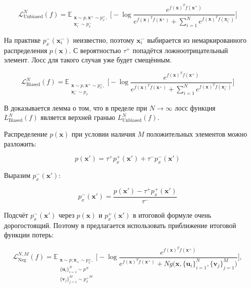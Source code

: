 \documentclass[a4paper, 14pt]{article}
\begin{document}
\begin{equation}\label{eq:1}
\mathcal{L}_{\text{Unbiased}}^N(f) = \mathbb{E}_{\substack{\textbf{x} \sim p, \textbf{x}^+ \sim p^+_x,\\ \textbf{x}_i^- \sim p_x^-}} \bigg[-\log \frac{e^{f(\textbf{x})^T f(\textbf{x}^+)}}{e^{f(\textbf{x})^T f(\textbf{x}^+)} + \sum _{i=1}^N e^{f(\textbf{x})^T f(\textbf{x}_i^-)}}\bigg]
\end{equation}

На практике $p_x^-(\textbf{x}_i^-)$ неизвестно, поэтому $\textbf{x}_i^-$ выбирается из немаркированного распределения $p(\textbf{x})$. С вероятностью $\tau^+$ попадётся ложноотрицательный элемент. Лосс для такого случая уже будет смещённым.

\begin{equation}\label{eq:2}
\mathcal{L}_{\text{Biased}}^N(f) = \mathbb{E}_{\substack{\textbf{x} \sim p, \textbf{x}^+ \sim p^+_x,\\ \textbf{x}_i^- \sim p_x}} \bigg[-\log \frac{e^{f(\textbf{x})^T f(\textbf{x}^+)}}{e^{f(\textbf{x})^T f(\textbf{x}^+)} + \sum _{i=1}^N e^{f(\textbf{x})^T f(\textbf{x}_i^-)}}\bigg]
\end{equation}

В \citep{chuang2020debiased} доказывается лемма о том, что в пределе при $N \to \infty$ лосс функция $L_{\text{Biased}}^N(f)$ является верхней гранью $L_{\text{Unbiased}}^N(f)$.

Распределение $p(\mathbf{x})$ при условии наличия $M$ положительных элементов можно разложить:

\begin{equation}\label{eq:3}
p(\textbf{x}') = \tau^+ p^+_x(\textbf{x}') + \tau^-p_x^-(\textbf{x}')
\end{equation}

Выразим $p^-_x(\textbf{x}')$:

\begin{equation} \label{eq:4}
p_x^-(\textbf{x}') = \frac{p(\textbf{x}') - \tau^+ p^+_x(\textbf{x}')}{\tau^-}
\end{equation}

Подсчёт $p^-_x(\textbf{x}')$ через $p(\mathbf{x})$ и $p^+_x(\textbf{x}')$ в итоговой формуле очень дорогостоящий. Поэтому в \citep{chuang2020debiased} предлагается использовать приближение итоговой функции потерь:

\begin{equation}\label{eq:5}
\mathcal{L}_{\text{Neg}}^{N, M}(f) = \mathbb{E}_{\substack{\textbf{x} \sim p; \textbf{x}_+ \sim p_x^+,\\ \{\textbf{u}_i\}_{i=1}^N \sim p^N \\ \{\textbf{v}_j\}_{j=1}^M \sim {p_x^+}^M}}  \bigg[ -\log \frac{e^{f(\textbf{x})^T f(\textbf{x}^+)} }{e^{f(\textbf{x})^T f(\textbf{x}^+)} + N g\big(\textbf{x}, \{\textbf{u}_i\}_{i=1}^N, \{\textbf{v}_j\}_{j=1}^M\big)} \bigg],
\end{equation}
\end{document}

